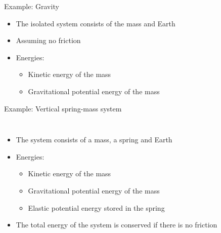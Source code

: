 \documentclass[12pt,compress,aspectratio=169]{beamer}
\newcommand{\mb}[1]{\ensuremath\mathbf{#1}}
\begin{document}
\begin{frame}{Example: Gravity}
  \begin{center}
  \end{center}
  
  \begin{itemize}
  \item The isolated system consists of the mass and Earth
  \item Assuming no friction
  \item Energies:
    \begin{itemize}
    \item Kinetic energy of the mass
    \item Gravitational potential energy of the mass
    \end{itemize}
  \end{itemize}
\end{frame}



\begin{frame}{Example: Vertical spring-mass system}
  \begin{columns}
    \begin{itemize}
    \item The system consists of a mass, a spring and Earth
    \item Energies:
      \begin{itemize}
      \item Kinetic energy of the mass
      \item Gravitational potential energy of the mass
      \item Elastic potential energy stored in the spring
      \end{itemize}
    \item The total energy of the system is conserved if there is no friction
    \end{itemize}
  \end{columns}
\end{frame}
\end{document}
